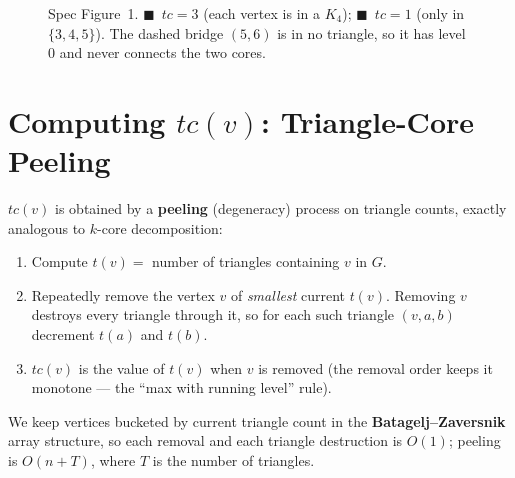 \documentclass[11pt]{article}
\begin{document}
\begin{figure}[h]
\centering
{}
\caption{Spec Figure~1. \textcolor{core3}{$\blacksquare$}~$tc=3$
(each vertex is in a $K_4$); \textcolor{core1}{$\blacksquare$}~$tc=1$ (only in
$\{3,4,5\}$). The \textcolor{bridgecol}{dashed} bridge $(5,6)$ is in no triangle,
so it has level $0$ and never connects the two cores.}
\label{fig:g1}
\end{figure}

\section{Computing $tc(v)$: Triangle-Core Peeling}
$tc(v)$ is obtained by a \textbf{peeling} (degeneracy) process on triangle
counts, exactly analogous to $k$-core decomposition:
\begin{enumerate}[leftmargin=1.6em, itemsep=2pt]
  \item Compute $t(v)=$ number of triangles containing $v$ in $G$.
  \item Repeatedly remove the vertex $v$ of \emph{smallest} current $t(v)$.
  Removing $v$ destroys every triangle through it, so for each such triangle
  $(v,a,b)$ decrement $t(a)$ and $t(b)$.
  \item $tc(v)$ is the value of $t(v)$ when $v$ is removed (the removal order
  keeps it monotone --- the ``max with running level'' rule).
\end{enumerate}
We keep vertices bucketed by current triangle count in the
\textbf{Batagelj--Zaversnik} array structure, so each removal and each triangle
destruction is $O(1)$; peeling is $O(n+T)$, where $T$ is the number of triangles.
\end{document}
